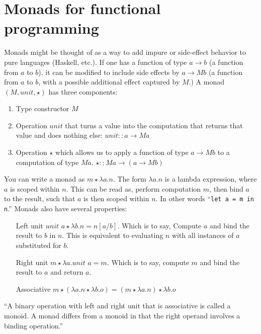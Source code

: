 \section{Monads for functional programming \cite{wadler1995monads}}
Monads might be thought of as a way to add impure or side-effect behavior to
pure languages (Haskell, etc.). If one has a function of type $a \rightarrow b$
(a function from $a$ to $b$), it can be modified to include side effects by
$a \rightarrow M b$ (a function from $a$ to $b$, with a possible additional
effect captured by $M$.) A monad $(M, \mathit{unit}, \star)$ has three
components:

\begin{enumerate}
    \item Type constructor $M$
    \item Operation $\mathit{unit}$ that turns a value into the computation that
    returns that value and does nothing else:
    \( \mathit{unit} :: a \rightarrow M a \)
    \item Operation $\star$ which allows us to apply a function of type
    $a \rightarrow M b$ to a computation of type $M a$.
    \( \star :: M a \rightarrow (a \rightarrow M b)\)
\end{enumerate}

You can write a monad as $m \star \lambda a . n$. The form $\lambda a . n$ is a
lambda expression, where $a$ is scoped within $n$. This can be read as, perform
computation $m$, then bind $a$ to the result, such that $a$ is then scoped
within $n$. In other words ``\lstinline|let a = m in n|.'' Monads also have
several properties:

\begin{enumerate}
    \item[Left unit] $\textit{unit } a \star \lambda b . n = n[a/b]$. Which is
    to say, Compute $a$ and bind the result to $b$ in $n$. This is equivalent to
    evaluating $n$ with all instances of $a$ substituted for $b$.
    \item[Right unit] $m \star \lambda a . \textit{unit } a = m$. Which is to
    say, compute $m$ and bind the result to $a$ and return $a$.
    \item[Associative] $m \star (\lambda a . n \star \lambda b . o) =
    (m \star \lambda a . n) \star \lambda b . o$
\end{enumerate}

``A binary operation with left and right unit that is associative is called a
monoid. A monad differs from a monoid in that the right operand involves a
binding operation.''